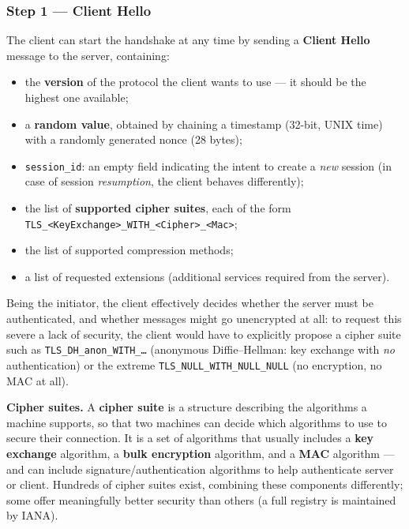 \documentclass[12pt, a4paper]{article}
\begin{document}
\subsubsection*{Step 1 --- Client Hello}
The client can start the handshake at any time by sending a \textbf{Client Hello} message to the server, containing:
\begin{itemize}
    \item the \textbf{version} of the protocol the client wants to use --- it should be the highest one available;
    \item a \textbf{random value}, obtained by chaining a timestamp (32-bit, UNIX time) with a randomly generated nonce (28 bytes);
    \item \texttt{session\_id}: an empty field indicating the intent to create a \emph{new} session (in case of session \emph{resumption}, the client behaves differently);
    \item the list of \textbf{supported cipher suites}, each of the form \texttt{TLS\_<KeyExchange>\_WITH\_<Cipher>\_<Mac>};
    \item the list of supported compression methods;
    \item a list of requested extensions (additional services required from the server).
\end{itemize}
Being the initiator, the client effectively decides whether the server must be authenticated, and whether messages might go unencrypted at all: to request this severe a lack of security, the client would have to explicitly propose a cipher suite such as \texttt{TLS\_DH\_anon\_WITH\_\dots} (anonymous Diffie--Hellman: key exchange with \emph{no} authentication) or the extreme \texttt{TLS\_NULL\_WITH\_NULL\_NULL} (no encryption, no MAC at all).

\textbf{Cipher suites.} A \textbf{cipher suite} is a structure describing the algorithms a machine supports, so that two machines can decide which algorithms to use to secure their connection. It is a set of algorithms that usually includes a \textbf{key exchange} algorithm, a \textbf{bulk encryption} algorithm, and a \textbf{MAC} algorithm --- and can include signature/authentication algorithms to help authenticate server or client. Hundreds of cipher suites exist, combining these components differently; some offer meaningfully better security than others (a full registry is maintained by IANA).
\end{document}
